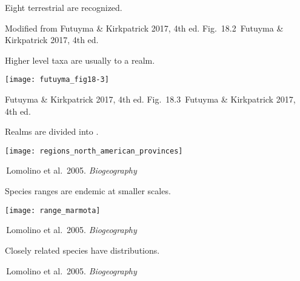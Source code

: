 \documentclass[t]{beamer}
\newcommand{\futuyma}[1]{%
	\ifthenelse{\isempty{#1}}%
	{Futuyma \& Kirkpatrick 2017, 4th ed.}%
	{Fig.~#1~Futuyma \& Kirkpatrick 2017, 4th ed.}%
}
\newcommand{\backskip}{\vspace{-0.5\baselineskip}}
\begin{document}

{
\begin{frame}[b]

\end{frame}
}

{
\begin{frame}{Eight terrestrial  are recognized.}

\tinyfill Modified from \futuyma{18.2}
\end{frame}
}



\begin{frame}{Higher level taxa are usually  to a realm.}

\backskip

\texttt{[image: futuyma\_fig18-3]}
	

\tinyfill \futuyma{18.3}

\end{frame}


\begin{frame}{Realms are divided into .}

\backskip

\centering

\texttt{[image: regions\_north\_american\_provinces]}
	

\tinyfill \textcopyright\,Lomolino et al.~2005. \emph{Biogeography}

\end{frame}



\begin{frame}{Species ranges are endemic at smaller scales.}

\backskip

\texttt{[image: range\_marmota]}
	

\tinyfill \textcopyright\,Lomolino et al.~2005. \emph{Biogeography}


\end{frame}

%
{
\begin{frame}[t]{Closely related species have  distributions.}

\tinyfill \textcopyright\,Lomolino et al.~2005. \emph{Biogeography}

\end{frame}
}
%
%
\end{document}
